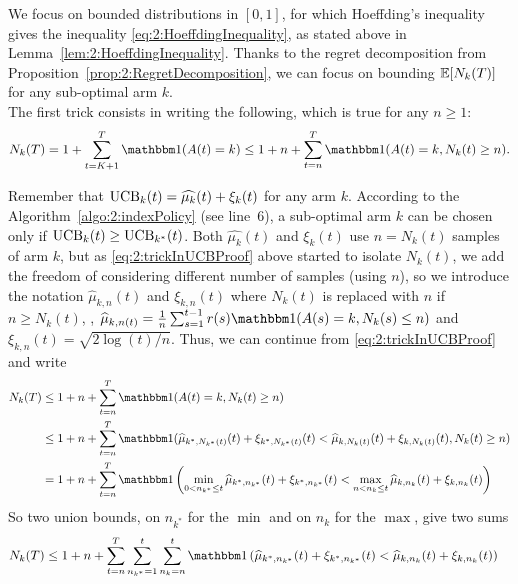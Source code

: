\begin{smallproof}\label{proof:2:UCBregretBound}
    We focus on bounded distributions in $[0,1]$, for which Hoeffding's inequality gives the inequality \eqref{eq:2:HoeffdingInequality}, as stated above in Lemma~\ref{lem:2:HoeffdingInequality}.
    Thanks to the regret decomposition from Proposition~\ref{prop:2:RegretDecomposition}, we can focus on bounding $\mathbb{E}[N_k(T)]$ for any sub-optimal arm $k$.\\
    \indent
    The first trick consists in writing the following, which is true for any $n \geq 1$:
    \begin{equation}\label{eq:2:trickInUCBProof}
        N_k(T) = 1 + \sum_{t=K+1}^T \indic(A(t) = k)
        \leq 1 + n + \sum_{t=n}^T \indic(A(t) = k, N_k(t) \geq n).
    \end{equation}


    Remember that $\mathrm{UCB}_k(t) = \widehat{\mu_k}(t) + \xi_k(t)$ for any arm $k$.
    According to the Algorithm~\ref{algo:2:indexPolicy} (see line~6),
    a sub-optimal arm $k$ can be chosen only if $\mathrm{UCB}_k(t) \geq \mathrm{UCB}_{k^*}(t)$.
    Both $\widehat{\mu_k}(t)$ and $\xi_k(t)$ use $n=N_k(t)$ samples of arm $k$,
    but as \eqref{eq:2:trickInUCBProof} above started to isolate $N_k(t)$, we add the freedom of considering different number of samples (using $n$), so we introduce the notation
    $\widehat{\mu}_{k,n}(t)$ and $\xi_{k,n}(t)$ where $N_k(t)$ is replaced with $n$ if $n \geq N_k(t)$,
    \ie, $\widehat{\mu}_{k,n(t)} = \frac{1}{n} \sum_{s=1}^{t-1} r(s) \indic(A(s)=k, N_k(s) \leq n)$ and $\xi_{k,n}(t) = \sqrt{2\log(t) / n}$.
    Thus, we can continue from \eqref{eq:2:trickInUCBProof} and write
    \begin{align}\label{eq:2:decompositionInUCBProof}
        N_k(T)
        & \leq 1 + n + \sum_{t=n}^T \indic(A(t) = k, N_k(t) \geq n) \nonumber \\
        & \leq 1 + n + \sum_{t=n}^T \indic(\widehat{\mu}_{k^*,N_{k^*}(t)}(t) + \xi_{k^*,N_{k^*}(t)}(t) < \widehat{\mu}_{k,N_k(t)}(t) + \xi_{k,N_k(t)}(t), N_k(t) \geq n)  \nonumber \\
        & = 1 + n + \sum_{t=n}^T \indic\left(\min_{0 < n_{k^*} \leq t} \widehat{\mu}_{k^*,n_{k^*}}(t) + \xi_{k^*,n_{k^*}}(t) < \max_{n < n_k \leq t} \widehat{\mu}_{k,n_k}(t) + \xi_{k,n_k}(t) \right)
    \end{align}
    So two union bounds, on $n_{k^*}$ for the $\min$ and on $n_k$ for the $\max$, give two sums
    \begin{align}\label{eq:2:decompositionInUCBProof2}
        N_k(T)
        & \leq 1 + n + \sum_{t=n}^T \sum_{n_{k^*}=1}^t \sum_{n_{k}=n}^t  \indic\left( \widehat{\mu}_{k^*,n_{k^*}}(t) + \xi_{k^*,n_{k^*}}(t) < \widehat{\mu}_{k,n_k}(t) + \xi_{k,n_k}(t) \right)
    \end{align}


\end{smallproof}

